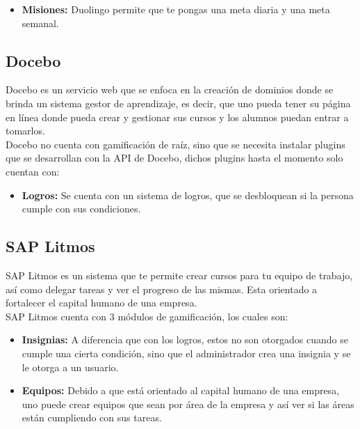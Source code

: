 \begin{multicols*}{2}
\begin{itemize}
    \item {\bf Misiones:} Duolingo permite que te pongas una meta diaria y una meta semanal.

    \end{itemize}


\subsection*{Docebo}

 Docebo es un servicio web que se enfoca en la creación de dominios donde se brinda
 un sistema gestor de aprendizaje, es decir, que uno pueda tener su página en línea
 donde pueda crear y gestionar sus cursos y los alumnos puedan entrar a tomarlos.\\

 \noindent Docebo no cuenta con gamificación de raíz, sino que se necesita instalar
 plugins que se desarrollan con la API de Docebo, dichos plugins hasta el momento
 solo cuentan con:

    \begin{itemize}
        \item {\bf Logros:} Se cuenta con un sistema de logros,
        que se desbloquean si la persona cumple con sus condiciones.
    \end{itemize}



\subsection*{SAP Litmos}

 SAP Litmos es un sistema que te permite crear cursos para tu equipo de trabajo,
 así como delegar tareas y ver el progreso de las mismas. Esta orientado a
 fortalecer el capital humano de una empresa.\\

    \noindent SAP Litmos cuenta con 3 módulos de gamificación, los cuales son:

    \begin{itemize}
        \item {\bf Insignias:} A diferencia que con los logros, estos
        no son otorgados cuando se cumple una cierta condición, sino
        que el administrador crea una insignia y se le otorga a un usuario.

        \item {\bf Equipos: } Debido a que está orientado al capital humano
         de una empresa, uno puede crear equipos que sean por área de la
          empresa y así ver si las áreas están cumpliendo con sus tareas.


\end{itemize}
\end{multicols*}
